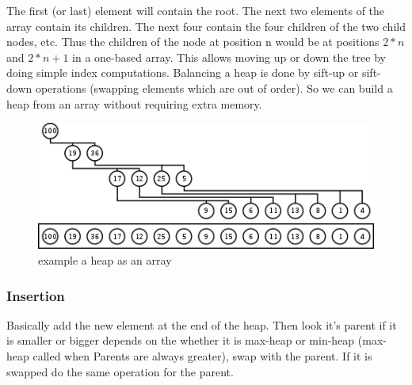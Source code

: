 \documentclass[12pt]{article}
\begin{document}
     The first (or last) element will contain the root. The next two elements of the array contain its children. The next four contain the four children of the two child nodes, etc. Thus the children of the node at position n would be at positions $2*n$ and $2*n + 1$ in a one-based array. This allows moving up or down the tree by doing simple index computations. Balancing a heap is done by sift-up or sift-down operations (swapping elements which are out of order). So we can build a heap from an array without requiring extra memory.

    \begin{figure}
      \centering
      \includegraphics[width=\linewidth]{Heap-as-array.png}
     \caption{example a heap as an array}
     \label{fig:binary}
    
    \end{figure}
     
     \subsubsection{Insertion}
        Basically add the new element at the end of the heap. Then look it's parent if it is smaller or bigger depends on the whether it is max-heap or min-heap (max-heap called when Parents are always greater), swap with the parent. If it is swapped do the same operation for the parent.
        
\end{document}

